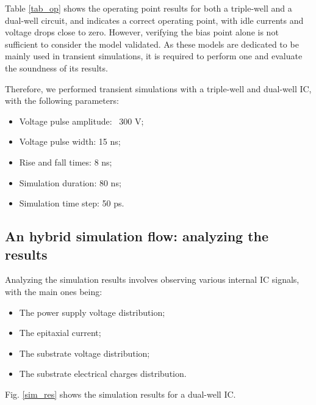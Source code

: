 	Table \ref{tab_op} shows the operating point results for both a triple-well and a dual-well circuit, and indicates a correct operating point, with idle currents and voltage drops close to zero.
	However, verifying the bias point alone is not sufficient to consider the model validated.
	As these models are dedicated to be mainly used in transient simulations, it is required to perform one and evaluate the soundness of its results.

	Therefore, we performed transient simulations with a triple-well and dual-well IC, with the following parameters:
	\begin{itemize}
		\item Voltage pulse amplitude: \textpm\ 300 V;
		\item Voltage pulse width: 15 ns;
		\item Rise and fall times: 8 ns;
		\item Simulation duration: 80 ns;
		\item Simulation time step: 50 ps.
	\end{itemize}

\subsection{An hybrid simulation flow: analyzing the results}
	Analyzing the simulation results involves observing various internal IC signals, with the main ones being:
	\begin{itemize}
		\item The power supply voltage distribution;
		\item The epitaxial current;
		\item The substrate voltage distribution;
		\item The substrate electrical charges distribution.
	\end{itemize}
	
	Fig. \ref{sim_res} shows the simulation results for a dual-well IC.
